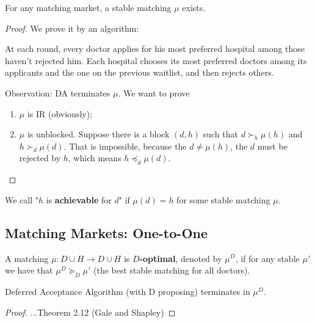 \documentclass[11pt]{elegantbook}
\begin{document}
\begin{theorem}
    For any matching market, a stable matching $\mu$ exists.
\end{theorem}
\begin{proof}
    We prove it by an algorithm:
    \begin{definition}
        \normalfont
        At each round, every doctor applies for his most preferred hospital among those haven't rejected him. Each hospital chooses its most preferred doctors among its applicants and the one on the previous waitlist, and then rejects others.
    \end{definition}
    Observation: DA terminates $\mu$. We want to prove
    \begin{enumerate}
        \item $\mu$ is IR (obviously);
        \item $\mu$ is unblocked.
        \subitem Suppose there is a block $(d,h)$ such that $d\succ_h \mu(h)$ and $h\succ_d \mu(d)$. That is impossible, because the $d\neq \mu(h)$, the $d$ must be rejected by $h$, which means $h\preceq_d \mu(d)$.
    \end{enumerate}
\end{proof}

\begin{note}
    We call "$h$ is \textbf{achievable} for $d$" if $\mu(d)=h$ for some stable matching $\mu$.
\end{note}


\subsection{Matching Markets: One-to-One}
\begin{definition}
    \normalfont
    A matching $\mu: D\cup H \rightarrow D\cup H$ is \textbf{$D$-optimal}, denoted by $\mu^D$, if for any stable $\mu'$ we have that $\mu^D\succeq_D \mu'$ (the best stable matching for all doctors).
\end{definition}

\begin{theorem}
    Deferred Acceptance Algorithm (with D proposing) terminates in $\mu^D$.
\end{theorem}
\begin{proof}
    ...Theorem 2.12 (Gale and Shapley)
\end{proof}
\end{document}
